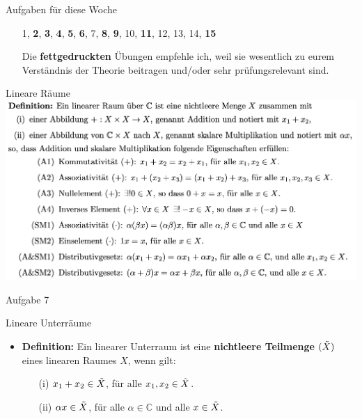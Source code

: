 \documentclass[14pt, aspectratio=169, handout]{beamer}
\begin{document}
\begin{frame}{Aufgaben für diese Woche}
    \begin{itemize}
        \item[] 1, \textbf{2}, \textbf{3}, \textbf{4}, \textbf{5}, \textbf{6}, 7, \textbf{8}, \textbf{9}, 10, \textbf{11}, 12, 13, 14, \textbf{15}
        \item[] 
        \item[] Die \textbf{fettgedruckten} Übungen empfehle ich, weil sie wesentlich zu eurem Verständnis der Theorie beitragen und/oder sehr prüfungsrelevant sind.
    \end{itemize}
\end{frame}


\begin{frame}{Lineare Räume}
    \includegraphics[width=\linewidth]{figures/linearer_raum.png}
\end{frame}

\begin{frame}{Aufgabe 7}
\end{frame}

\begin{frame}{Lineare Unterräume}
    \begin{itemize}
        \item \textbf{Definition:} Ein linearer Unterraum ist eine \textbf{nichtleere Teilmenge} $(\Tilde{X})$ eines linearen Raumes $X$, wenn gilt:
        \item[] 
    \item[] \begin{itemize}
                \item[(i)] $x_1 + x_2 \in \Tilde{X}$, für alle $x_1, x_2 \in \Tilde{X}$.
                \item[] 
                \item[(ii)] $\alpha x \in \Tilde{X}$, für alle $\alpha \in \mathbb{C}$ und alle $x\in \Tilde{X}$.
            \end{itemize}
    \end{itemize}
\end{frame}
\end{document}
